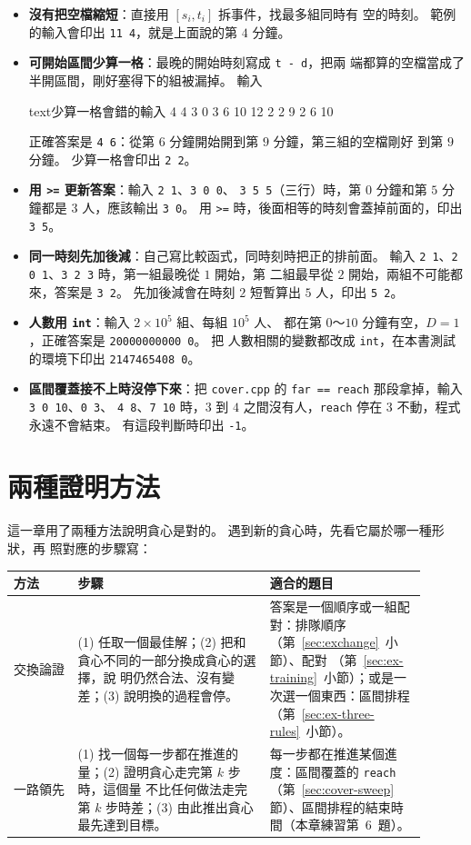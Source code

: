 \begin{itemize}
\item \textbf{沒有把空檔縮短}：直接用 $[s_i, t_i]$ 拆事件，找最多組同時有
空的時刻。 範例的輸入會印出 \texttt{11 4}，就是上面說的第 $4$ 分鐘。
\item \textbf{可開始區間少算一格}：最晚的開始時刻寫成 \texttt{t - d}，把兩
端都算的空檔當成了半開區間，剛好塞得下的組被漏掉。 輸入
\begin{code}{text}{少算一格會錯的輸入}
4 4
3 0 3
6 10 12
2 2 9
2 6 10
\end{code}
正確答案是 \texttt{4 6}：從第 $6$ 分鐘開始開到第 $9$ 分鐘，第三組的空檔剛好
到第 $9$ 分鐘。 少算一格會印出 \texttt{2 2}。
\item \textbf{用 \texttt{>=} 更新答案}：輸入 \texttt{2 1}、\texttt{3 0 0}、
\texttt{3 5 5}（三行）時，第 $0$ 分鐘和第 $5$ 分鐘都是 $3$ 人，應該輸出
\texttt{3 0}。 用 \texttt{>=} 時，後面相等的時刻會蓋掉前面的，印出
\texttt{3 5}。
\item \textbf{同一時刻先加後減}：自己寫比較函式，同時刻時把正的排前面。 輸入
\texttt{2 1}、\texttt{2 0 1}、\texttt{3 2 3} 時，第一組最晚從 $1$ 開始，第
二組最早從 $2$ 開始，兩組不可能都來，答案是 \texttt{3 2}。 先加後減會在時刻
$2$ 短暫算出 $5$ 人，印出 \texttt{5 2}。
\item \textbf{人數用 \texttt{int}}：輸入 $2 \times 10^5$ 組、每組 $10^5$ 人、
都在第 $0$～$10$ 分鐘有空，$D = 1$，正確答案是 \texttt{20000000000 0}。 把
人數相關的變數都改成 \texttt{int}，在本書測試的環境下印出
\texttt{2147465408 0}。
\item \textbf{區間覆蓋接不上時沒停下來}：把 \texttt{cover.cpp} 的
\texttt{far == reach} 那段拿掉，輸入 \texttt{3 0 10}、\texttt{0 3}、
\texttt{4 8}、\texttt{7 10} 時，$3$ 到 $4$ 之間沒有人，\texttt{reach} 停在
$3$ 不動，程式永遠不會結束。 有這段判斷時印出 \texttt{-1}。
\end{itemize}

\section{兩種證明方法}
\label{sec:two-proofs}

這一章用了兩種方法說明貪心是對的。 遇到新的貪心時，先看它屬於哪一種形狀，再
照對應的步驟寫：

\begin{center}
\begin{tabular}{p{0.14\linewidth}p{0.42\linewidth}p{0.34\linewidth}}
\toprule
方法 & 步驟 & 適合的題目 \\
\midrule
交換論證 & (1) 任取一個最佳解；(2) 把和貪心不同的一部分換成貪心的選擇，說
明仍然合法、沒有變差；(3) 說明換的過程會停。 &
答案是一個順序或一組配對：排隊順序（第~\ref{sec:exchange}~小節）、配對
（第~\ref{sec:ex-training}~小節）；或是一次選一個東西：區間排程
（第~\ref{sec:ex-three-rules}~小節）。 \\
一路領先 & (1) 找一個每一步都在推進的量；(2) 證明貪心走完第 $k$ 步時，這個量
不比任何做法走完第 $k$ 步時差；(3) 由此推出貪心最先達到目標。 &
每一步都在推進某個進度：區間覆蓋的 \texttt{reach}（第~\ref{sec:cover-sweep}~
節）、區間排程的結束時間（本章練習第~6~題）。 \\
\bottomrule
\end{tabular}
\end{center}

